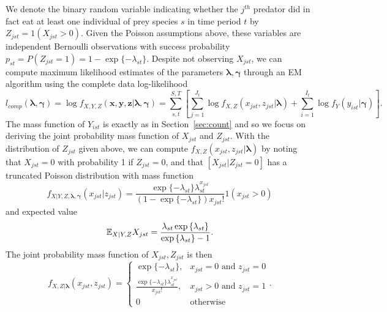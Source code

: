 \documentclass[smallextended]{svjour3}
\begin{document}
We denote the binary random variable indicating whether the $j^{th}$ predator did in fact eat at least one individual of prey species $s$ in time period $t$ by $Z_{jst} = 1(X_{jst} > 0)$.  Given the Poisson assumptions above, these variables are independent Bernoulli observations with success probability $p_{st} = P(Z_{jst}=1)= 1-\exp\{-\lambda_{st}\}$.  Despite not observing $X_{jst}$, we can compute maximum likelihood estimates of the parameters $\boldsymbol{\lambda}, \boldsymbol{\gamma}$ through an EM algorithm using the complete data log-likelihood
\[
l_{comp}(\boldsymbol{\lambda}, \boldsymbol{\gamma}) = \log f_{X,Y,Z}(\boldsymbol x, \boldsymbol y, \boldsymbol z|\boldsymbol{\lambda}, \boldsymbol{\gamma}) = \sum_{s,t}^{S,T} \left[ \sum_{j=1}^{J_t} \log f_{X,Z}(x_{jst},z_{jst}|\boldsymbol{\lambda}) + \sum_{i=1}^{I_t}\log f_Y(y_{ist}|\boldsymbol{\gamma}) \right].
\]
The mass function of $Y_{ist}$ is exactly as in Section~\ref{sec:count} and so we focus on deriving the joint probability mass function of $X_{jst}$ and $Z_{jst}$.  With the distribution of $Z_{jst}$ given above, we can compute $f_{X,Z}(x_{jst},z_{jst}|\boldsymbol{\lambda})$ by noting that $X_{jst}=0$ with probability 1 if $Z_{jst}=0$, and that $[X_{jst}|Z_{jst}=0]$ has a truncated Poisson distribution with mass function
\[
  f_{X|Y,Z,\boldsymbol{\lambda},\boldsymbol{\gamma}}(x_{jst}|z_{jst}) =
  \frac{\exp{\{-\lambda_{st}\}} \lambda_{st}^{x_{jst}}}{(1 - \exp{\{-\lambda_{st}\}}) x_{jst}!}1(x_{jst} > 0)
\]
and expected value
\[
\mathbb{E}_{X|Y,Z}X_{jst} = \frac{\lambda_{st} \exp{\{\lambda_{st} \}}}{\exp{\{ \lambda_{st} \}} - 1}.
\]
The joint probability mass function of $X_{jst}, Z_{jst}$ is then 
\begin{equation*}
    f_{X,Z|\boldsymbol{\lambda}}(x_{jst},z_{jst}) = \left\{
    \begin{array}{lr}
      \exp{\{ -\lambda_{st} \}}, & x_{jst}=0 \mbox{ and } z_{jst} = 0 \\
      \frac{\exp{\{-\lambda_{st} \}} \lambda_{st}^{x_{jst}}}{x_{jst}!}, & x_{jst} > 0 \mbox{ and } z_{jst} = 1 \\
      0 & \mbox{otherwise}
    \end{array}
  \right..
\end{equation*}
\end{document}
